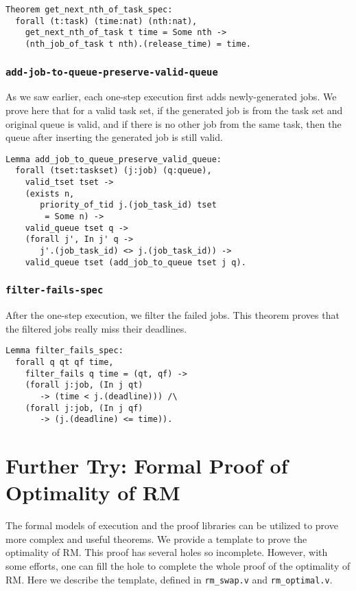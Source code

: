 \documentclass[nocopyrightspace]{sigplanconf}
\begin{document}
\begin{verbatim}
Theorem get_next_nth_of_task_spec:
  forall (t:task) (time:nat) (nth:nat),
    get_next_nth_of_task t time = Some nth ->
    (nth_job_of_task t nth).(release_time) = time.
\end{verbatim}


\subsubsection{\texttt{add-job-to-queue-preserve-valid-queue}}

As we saw earlier, each one-step execution first adds newly-generated jobs. We prove here that
for a valid task set, if the generated job is from the task set and original queue is valid,
and if there is no other job from the same task, then the queue after inserting the generated job
is still valid.

\begin{verbatim}
Lemma add_job_to_queue_preserve_valid_queue:
  forall (tset:taskset) (j:job) (q:queue),
    valid_tset tset ->
    (exists n,
       priority_of_tid j.(job_task_id) tset
        = Some n) ->
    valid_queue tset q ->
    (forall j', In j' q ->
       j'.(job_task_id) <> j.(job_task_id)) ->
    valid_queue tset (add_job_to_queue tset j q).
\end{verbatim}


\subsubsection{\texttt{filter-fails-spec}}

After the one-step execution, we filter the failed jobs. This theorem proves that the filtered jobs
really miss their deadlines.

\begin{verbatim}
Lemma filter_fails_spec:
  forall q qt qf time,
    filter_fails q time = (qt, qf) ->
    (forall j:job, (In j qt)
       -> (time < j.(deadline))) /\
    (forall j:job, (In j qf)
       -> (j.(deadline) <= time)).
\end{verbatim}

\section{Further Try: Formal Proof of Optimality of RM}

The formal models of execution and the proof libraries can be utilized to prove more complex and useful theorems.
We provide a template to prove the optimality of RM. This proof has several holes so incomplete. However,
with some efforts, one can fill the hole to complete the whole proof of the optimality of RM.
Here we describe the template, defined in \texttt{rm\_swap.v} and \texttt{rm\_optimal.v}.
\end{document}
